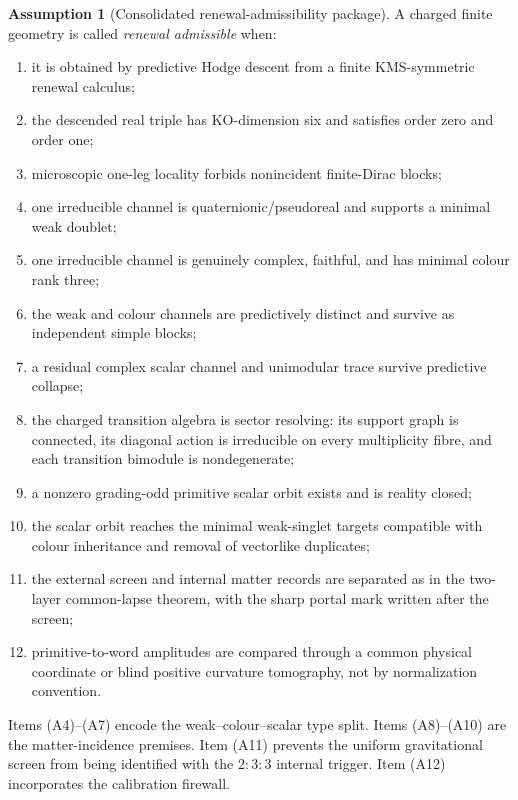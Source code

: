 \documentclass[11pt,oneside,openany]{book}
\numberwithin{equation}{chapter}
\theoremstyle{definition}
\newtheorem{assumption}[theorem]{Assumption}
\theoremstyle{remark}
\begin{document}
\begin{assumption}[Consolidated renewal-admissibility package]
\label{ass:renewal-admissibility}
A charged finite geometry is called \emph{renewal admissible} when:

\begin{enumerate}[label=\textup{(A\arabic*)},leftmargin=2.8em]
\item it is obtained by predictive Hodge descent from a finite
      KMS-symmetric renewal calculus;
\item the descended real triple has KO-dimension six and satisfies order zero
      and order one;
\item microscopic one-leg locality forbids nonincident finite-Dirac blocks;
\item one irreducible channel is quaternionic/pseudoreal and supports a
      minimal weak doublet;
\item one irreducible channel is genuinely complex, faithful, and has minimal
      colour rank three;
\item the weak and colour channels are predictively distinct and survive as
      independent simple blocks;
\item a residual complex scalar channel and unimodular trace survive
      predictive collapse;
\item the charged transition algebra is sector resolving: its support graph is
      connected, its diagonal action is irreducible on every multiplicity
      fibre, and each transition bimodule is nondegenerate;
\item a nonzero grading-odd primitive scalar orbit exists and is reality
      closed;
\item the scalar orbit reaches the minimal weak-singlet targets compatible
      with colour inheritance and removal of vectorlike duplicates;
\item the external screen and internal matter records are separated as in the
      two-layer common-lapse theorem, with the sharp portal mark written after
      the screen;
\item primitive-to-word amplitudes are compared through a common physical
      coordinate or blind positive curvature tomography, not by normalization
      convention.
\end{enumerate}
\end{assumption}

Items (A4)--(A7) encode the weak--colour--scalar type split.  Items
(A8)--(A10) are the matter-incidence premises.  Item (A11) prevents the
uniform gravitational screen from being identified with the \(2{:}3{:}3\)
internal trigger.  Item (A12) incorporates the calibration firewall.
\end{document}
